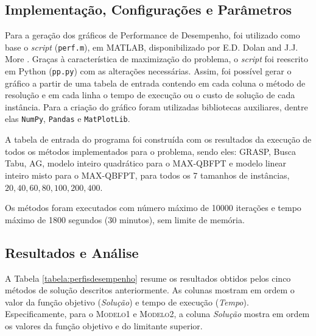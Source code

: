 \documentclass{MO824}
\begin{document}
\subsection{Implementação, Configurações e Parâmetros}
Para a geração dos gráficos de Performance de Desempenho, foi utilizado como base o \textit{script} (\texttt{perf.m}), em MATLAB, disponibilizado por E.D. Dolan and J.J. More  \cite{pp}. Graças à característica de maximização do problema, o \textit{script} foi reescrito em Python (\texttt{pp.py}) com as alterações necessárias. Assim, foi possível gerar o gráfico a partir de uma tabela de entrada contendo em cada coluna o método de resolução e em cada linha o tempo de execução ou o custo de solução de cada instância. Para a criação do gráfico foram utilizadas bibliotecas auxiliares, dentre elas \texttt{NumPy}, \texttt{Pandas} e \texttt{MatPlotLib}. 

A tabela de entrada do programa foi construída com os resultados da execução de todos os métodos implementados para o problema, sendo eles: GRASP, Busca Tabu, AG, modelo inteiro quadrático para o MAX-QBFPT e modelo linear inteiro misto para o MAX-QBFPT, para todos os 7 tamanhos de instâncias, $20, 40, 60, 80, 100, 200, 400$.

Os métodos foram executados com número máximo de 10000 iterações e tempo máximo de 1800 segundos (30 minutos), sem limite de memória.

\subsection{Resultados e Análise}

A Tabela \ref{tabela:perfisdesempenho} resume os resultados obtidos pelos cinco métodos de solução descritos anteriormente. As colunas mostram em ordem o valor da função objetivo (\textit{Solução}) e tempo de execução (\textit{Tempo}). Especificamente, para o \textsc{Modelo1} e \textsc{Modelo2}, a coluna \textit{Solução} mostra em ordem os valores da função objetivo e do limitante superior.
\end{document}

